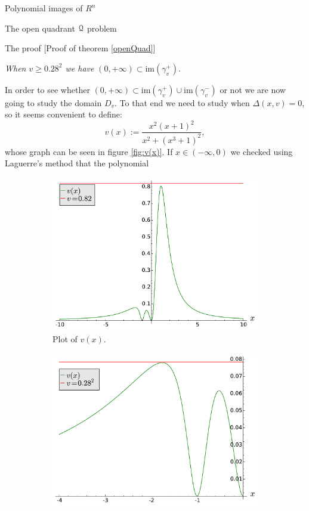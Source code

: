 \documentclass[11pt, a4paper, english, twoside, notitlepage, openright]{report}
\begin{document}
\begin{chapter}{Polynomial images of $R^n$}
\begin{section}{The open quadrant $\mathcal{Q}$ problem}
\begin{subsection}{The proof} [Proof of theorem \ref{openQuad}]
\begin{center}
 \emph{When $v\geq 0.28^2$ we have} $(0,+\infty)\subset\text{im}(\gamma_v^+)$.
\end{center}\label{step3}
In order to see whether $(0,+\infty)\subset\text{im}(\gamma_v^+)\cup\text{im}(\gamma_v^-)$ or not we are now going to study the domain $D_v$. To that end we need to study when $\Delta(x,v)=0$, so it seems convenient to define:
$$
v(x):=\frac{x^2(x+1)^2}{x^2+(x^3+1)^2},
$$
whose graph can be seen in figure \ref{fig:v(x)}. If $x\in(-\infty,0)$ we checked using Laguerre's method that the polynomial
\begin{figure}[h]\hspace{-1.75cm}
\begin{subfigure}{.6\linewidth}\centering
\includegraphics[width=1\textwidth]{plots/ch1_10_uve.pdf}
\caption{Plot of $v(x)$.\label{fig:uve}}
\end{subfigure}
\begin{subfigure}{.6\linewidth}\centering
\includegraphics[width=1\textwidth]{plots/ch1_11_uve_detail.pdf}

\end{subfigure}
\end{figure}
\end{subsection}
\end{section}
\end{chapter}
\end{document}
